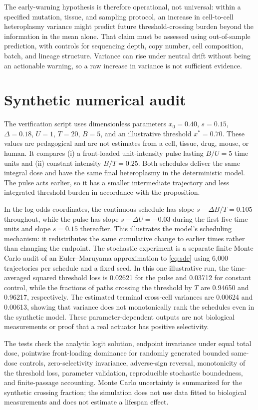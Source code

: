 \documentclass[11pt]{article}
\begin{document}
The early-warning hypothesis is therefore operational, not universal: within a specified mutation, tissue, and sampling protocol, an increase in cell-to-cell heteroplasmy variance might predict future threshold-crossing burden beyond the information in the mean alone. That claim must be assessed using out-of-sample prediction, with controls for sequencing depth, copy number, cell composition, batch, and lineage structure. Variance can rise under neutral drift without being an actionable warning, so a raw increase in variance is not sufficient evidence.

\section{Synthetic numerical audit}
The verification script uses dimensionless parameters $x_0=0.40$, $s=0.15$, $\Delta=0.18$, $U=1$, $T=20$, $B=5$, and an illustrative threshold $x^*=0.70$. These values are pedagogical and are not estimates from a cell, tissue, drug, mouse, or human. It compares (i) a front-loaded unit-intensity pulse lasting $B/U=5$ time units and (ii) constant intensity $B/T=0.25$. Both schedules deliver the same integral dose and have the same final heteroplasmy in the deterministic model. The pulse acts earlier, so it has a smaller intermediate trajectory and less integrated threshold burden in accordance with the proposition.

In the log-odds coordinates, the continuous schedule has slope $s-\Delta B/T=0.105$ throughout, while the pulse has slope $s-\Delta U=-0.03$ during the first five time units and slope $s=0.15$ thereafter. This illustrates the model's scheduling mechanism: it redistributes the same cumulative change to earlier times rather than changing the endpoint. The stochastic experiment is a separate finite Monte Carlo audit of an Euler--Maruyama approximation to \eqref{eq:sde} using 6,000 trajectories per schedule and a fixed seed. In this one illustrative run, the time-averaged squared threshold loss is 0.02621 for the pulse and 0.03712 for constant control, while the fractions of paths crossing the threshold by \(T\) are 0.94650 and 0.96217, respectively. The estimated terminal cross-cell variances are 0.00624 and 0.00613, showing that variance does not monotonically rank the schedules even in the synthetic model. These parameter-dependent outputs are not biological measurements or proof that a real actuator has positive selectivity.

The tests check the analytic logit solution, endpoint invariance under equal total dose, pointwise front-loading dominance for randomly generated bounded same-dose controls, zero-selectivity invariance, adverse-sign reversal, monotonicity of the threshold loss, parameter validation, reproducible stochastic boundedness, and finite-passage accounting. Monte Carlo uncertainty is summarized for the synthetic crossing fraction; the simulation does not use data fitted to biological measurements and does not estimate a lifespan effect.
\end{document}
